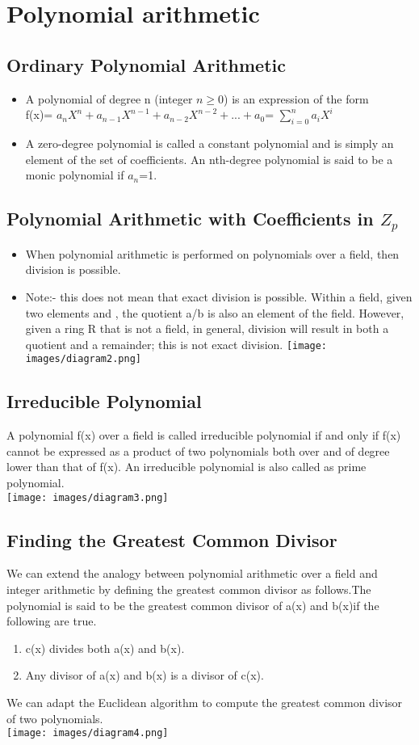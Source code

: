 \documentclass{article}
\begin{document}
\section{Polynomial arithmetic}
\subsection{Ordinary Polynomial Arithmetic}
\begin{itemize}
    \item A polynomial of degree n (integer $n \geq 0$) is an expression of the form
    $$ $$ f(x)= $a_n X^{n} + a_{n-1} X^{n-1} + a_{n-2} X^{n-2}+...+a_0$= $\sum_{i=0} ^{n} a_{i} X^{i}$
    \item A zero-degree polynomial is called a constant polynomial and is simply an element of the set of coefficients. An nth-degree polynomial is said to be a monic polynomial if $a_n$=1.
\end{itemize}
\subsection{Polynomial Arithmetic with Coefficients in $Z_p$}
\begin{itemize}
    \item When polynomial arithmetic is performed on polynomials over a field, then division is possible.
    \item Note:- this does not mean that exact division is possible. Within a field, given two elements and , the quotient a/b is also an element of the field. However, given a ring R that is not a field, in general, division will result in both a quotient and a remainder; this is not exact division.
    \texttt{[image: images/diagram2.png]}
\end{itemize}
\subsection{Irreducible Polynomial}
A polynomial f(x) over a field is called irreducible polynomial if and only if f(x) cannot be expressed as a product of two polynomials both over and of degree lower than that of f(x). An irreducible polynomial is also called as prime polynomial.\\
\texttt{[image: images/diagram3.png]}
\subsection{Finding the Greatest Common Divisor}
We can extend the analogy between polynomial arithmetic over a field and integer
arithmetic by defining the greatest common divisor as follows.The polynomial
is said to be the greatest common divisor of a(x) and b(x)if the following are true.
\begin{enumerate}
    \item c(x) divides both a(x) and b(x).
    \item Any divisor of a(x) and b(x) is a divisor of c(x).
\end{enumerate}
We can adapt the Euclidean algorithm to compute the greatest common divisor of two polynomials.\\
\texttt{[image: images/diagram4.png]}
\end{document}
